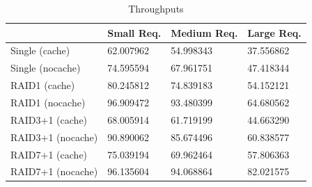 \documentclass[paper=a4, fontsize=11pt]{scrartcl} %
\numberwithin{figure}{section} %
\numberwithin{table}{section} %
\begin{document}
\begin{table}[h]
\centering
\caption{Throughputs}
\label{reptab1}
\begin{tabular}{|l|l|l|l|}
\hline
              & \textbf{Small Req.} & \textbf{Medium Req.} & \textbf{Large Req.} \\ \hline
Single (cache) & 62.007962                   & 54.998343                    & 37.556862                   \\ \hline
Single (nocache) & 74.595594                   & 67.961751                    & 47.418344                   \\ \hline
RAID1 (cache) & 80.245812                   & 74.839183                    & 54.152121                   \\ \hline
RAID1 (nocache) & 96.909472                   & 93.480399                    & 64.680562                   \\ \hline
RAID3+1 (cache) & 68.005914                   & 61.719199                    & 44.663290                   \\ \hline
RAID3+1 (nocache) & 90.890062                   & 85.674496                    & 60.838577                   \\ \hline
RAID7+1 (cache) & 75.039194                   & 69.962464                    & 57.806363                   \\ \hline
RAID7+1 (nocache) & 96.135604                   & 94.068864                    & 82.021575                   \\ \hline

\end{tabular}
\end{table}
\end{document}
